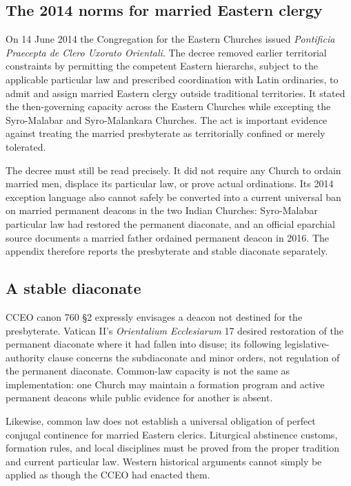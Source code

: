 \subsection{The 2014 norms for married Eastern clergy}

On 14 June 2014 the Congregation for the Eastern Churches issued \emph{Pontificia Praecepta de Clero Uxorato Orientali}. The decree removed earlier territorial constraints by permitting the competent Eastern hierarchs, subject to the applicable particular law and prescribed coordination with Latin ordinaries, to admit and assign married Eastern clergy outside traditional territories. It stated the then-governing capacity across the Eastern Churches while excepting the Syro-Malabar and Syro-Malankara Churches. The act is important evidence against treating the married presbyterate as territorially confined or merely tolerated.

The decree must still be read precisely. It did not require any Church to ordain married men, displace its particular law, or prove actual ordinations. Its 2014 exception language also cannot safely be converted into a current universal ban on married permanent deacons in the two Indian Churches: Syro-Malabar particular law had restored the permanent diaconate, and an official eparchial source documents a married father ordained permanent deacon in 2016. The appendix therefore reports the presbyterate and stable diaconate separately.

\subsection{A stable diaconate}

CCEO canon 760 \S2 expressly envisages a deacon not destined for the presbyterate. Vatican II's \emph{Orientalium Ecclesiarum} 17 desired restoration of the permanent diaconate where it had fallen into disuse; its following legislative-authority clause concerns the subdiaconate and minor orders, not regulation of the permanent diaconate. Common-law capacity is not the same as implementation: one Church may maintain a formation program and active permanent deacons while public evidence for another is absent.

Likewise, common law does not establish a universal obligation of perfect conjugal continence for married Eastern clerics. Liturgical abstinence customs, formation rules, and local disciplines must be proved from the proper tradition and current particular law. Western historical arguments cannot simply be applied as though the CCEO had enacted them.

